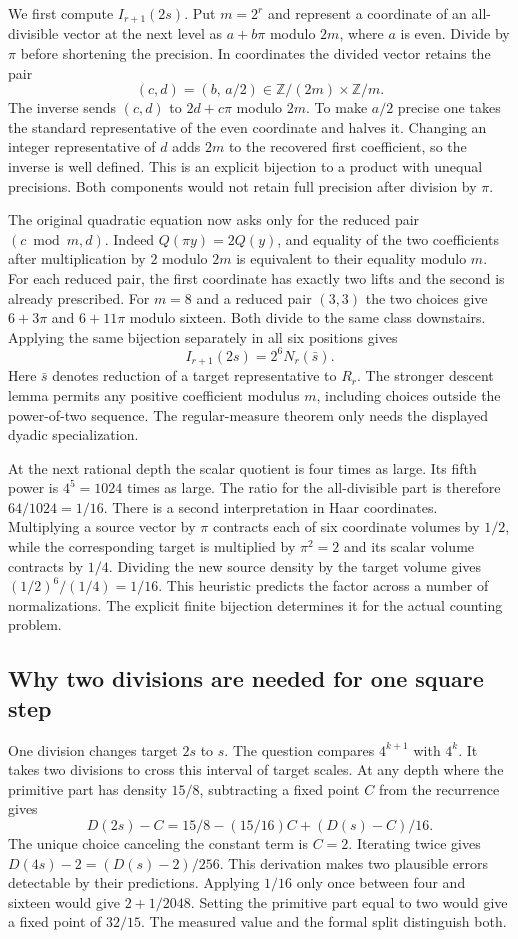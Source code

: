 \documentclass[12pt,letterpaper]{article}
\begin{document}
We first compute $I_{r+1}(2s)$. Put $m=2^r$ and represent a coordinate of an all-divisible vector at the next level as $a+b\pi$ modulo $2m$, where $a$ is even. Divide by $\pi$ before shortening the precision. In coordinates the divided vector retains the pair
\[
   (c,d)=(b,\,a/2)\in \mathbb Z/(2m)\times\mathbb Z/m.
\]
The inverse sends $(c,d)$ to $2d+c\pi$ modulo $2m$. To make $a/2$ precise one takes the standard representative of the even coordinate and halves it. Changing an integer representative of $d$ adds $2m$ to the recovered first coefficient, so the inverse is well defined. This is an explicit bijection to a product with unequal precisions. Both components would not retain full precision after division by $\pi$.

The original quadratic equation now asks only for the reduced pair $(c\bmod m,d)$. Indeed $Q(\pi y)=2Q(y)$, and equality of the two coefficients after multiplication by $2$ modulo $2m$ is equivalent to their equality modulo $m$. For each reduced pair, the first coordinate has exactly two lifts and the second is already prescribed. For $m=8$ and a reduced pair $(3,3)$ the two choices give $6+3\pi$ and $6+11\pi$ modulo sixteen. Both divide to the same class downstairs. Applying the same bijection separately in all six positions gives
\[
                    I_{r+1}(2s)=2^6 N_r(\bar s).
\]
Here $\bar s$ denotes reduction of a target representative to $R_r$. The stronger descent lemma permits any positive coefficient modulus $m$, including choices outside the power-of-two sequence. The regular-measure theorem only needs the displayed dyadic specialization.

At the next rational depth the scalar quotient is four times as large. Its fifth power is $4^5=1024$ times as large. The ratio for the all-divisible part is therefore $64/1024=1/16$. There is a second interpretation in Haar coordinates. Multiplying a source vector by $\pi$ contracts each of six coordinate volumes by $1/2$, while the corresponding target is multiplied by $\pi^2=2$ and its scalar volume contracts by $1/4$. Dividing the new source density by the target volume gives $(1/2)^6/(1/4)=1/16$. This heuristic predicts the factor across a number of normalizations. The explicit finite bijection determines it for the actual counting problem.

\subsection{Why two divisions are needed for one square step}
One division changes target $2s$ to $s$. The question compares $4^{k+1}$ with $4^k$. It takes two divisions to cross this interval of target scales. At any depth where the primitive part has density $15/8$, subtracting a fixed point $C$ from the recurrence gives
\[
       D(2s)-C = 15/8-(15/16)C + (D(s)-C)/16.
\]
The unique choice canceling the constant term is $C=2$. Iterating twice gives $D(4s)-2=(D(s)-2)/256$. This derivation makes two plausible errors detectable by their predictions. Applying $1/16$ only once between four and sixteen would give $2+1/2048$. Setting the primitive part equal to two would give a fixed point of $32/15$. The measured value and the formal split distinguish both.
\end{document}
